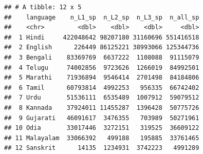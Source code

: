\documentclass[
]{book}
\newenvironment{Shaded}{\begin{snugshade}}{\end{snugshade}}
\newcommand{\DataTypeTok}[1]{\textcolor[rgb]{0.13,0.29,0.53}{#1}}
\newcommand{\KeywordTok}[1]{\textcolor[rgb]{0.13,0.29,0.53}{\textbf{#1}}}
\newcommand{\NormalTok}[1]{#1}
\newcommand{\OperatorTok}[1]{\textcolor[rgb]{0.81,0.36,0.00}{\textbf{#1}}}
\newcommand{\StringTok}[1]{\textcolor[rgb]{0.31,0.60,0.02}{#1}}
\begin{document}
\begin{Shaded}
\end{Shaded}

\begin{verbatim}
## # A tibble: 12 x 5
##    language    n_L1_sp  n_L2_sp  n_L3_sp  n_all_sp
##    <chr>         <dbl>    <dbl>    <dbl>     <dbl>
##  1 Hindi     422048642 98207180 31160696 551416518
##  2 English      226449 86125221 38993066 125344736
##  3 Bengali    83369769  6637222  1108088  91115079
##  4 Telugu     74002856  9723626  1266019  84992501
##  5 Marathi    71936894  9546414  2701498  84184806
##  6 Tamil      60793814  4992253   956335  66742402
##  7 Urdu       51536111  6535489  1007912  59079512
##  8 Kannada    37924011 11455287  1396428  50775726
##  9 Gujarati   46091617  3476355   703989  50271961
## 10 Odia       33017446  3272151   319525  36609122
## 11 Malayalam  33066392   499188   195885  33761465
## 12 Sanskrit      14135  1234931  3742223   4991289
\end{verbatim}
\end{document}
